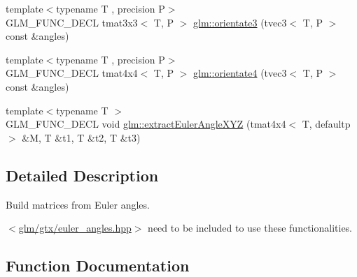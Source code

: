 \begin{DoxyCompactItemize}
\item 
{\footnotesize template$<$typename T , precision P$>$ }\\G\+L\+M\+\_\+\+F\+U\+N\+C\+\_\+\+D\+E\+C\+L tmat3x3$<$ T, P $>$ \hyperlink{group__gtx__euler__angles_ga33f0d790cecd8337ee83f8e3a8109b11}{glm\+::orientate3} (tvec3$<$ T, P $>$ const \&angles)
\item 
{\footnotesize template$<$typename T , precision P$>$ }\\G\+L\+M\+\_\+\+F\+U\+N\+C\+\_\+\+D\+E\+C\+L tmat4x4$<$ T, P $>$ \hyperlink{group__gtx__euler__angles_ga4e25c9468b6f002c76e9a2412bcfa503}{glm\+::orientate4} (tvec3$<$ T, P $>$ const \&angles)
\item 
{\footnotesize template$<$typename T $>$ }\\G\+L\+M\+\_\+\+F\+U\+N\+C\+\_\+\+D\+E\+C\+L void \hyperlink{group__gtx__euler__angles_ga77ab6440250bd8b7e87a06c5643d6e74}{glm\+::extract\+Euler\+Angle\+X\+Y\+Z} (tmat4x4$<$ T, defaultp $>$ \&M, T \&t1, T \&t2, T \&t3)
\end{DoxyCompactItemize}


\subsection{Detailed Description}
Build matrices from Euler angles. 

$<$\hyperlink{euler__angles_8hpp}{glm/gtx/euler\+\_\+angles.\+hpp}$>$ need to be included to use these functionalities. 

\subsection{Function Documentation}
\hypertarget{group__gtx__euler__angles_ga82cd3b8a04943f1a0d1a562aff358dc8}{}
